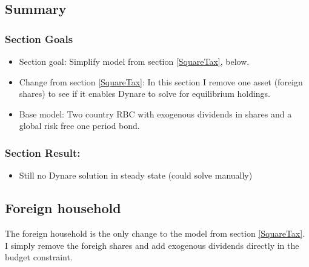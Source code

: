 \documentclass[a4paper]{article}
\begin{document}
\subsection{Summary}
\subsubsection{Section Goals}
\begin{itemize}
\item Section goal: Simplify model from section \ref{SquareTax}, below.
\item Change from section \ref{SquareTax}:  In this section I remove one asset (foreign shares) to see if it enables Dynare to solve for equilibrium holdings. 
\item Base model: Two country RBC with exogenous dividends in shares and a global risk free one period bond.
\end{itemize}

\subsubsection{Section Result:}
\begin{itemize}
\item Still no Dynare solution in steady state (could solve manually)
\end{itemize}

\subsection{Foreign household}
The foreign household is the only change to the model from section \ref{SquareTax}. I simply remove the foreigh shares and add exogenous dividends directly in the budget constraint. 
\end{document}
